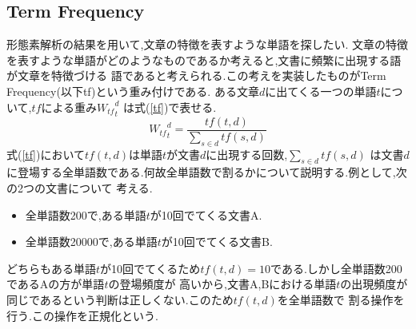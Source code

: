 \documentclass[a4j]{jarticle}
\begin{document}
\subsection{Term Frequency}
形態素解析の結果を用いて,文章の特徴を表すような単語を探したい.
文章の特徴を表すような単語がどのようなものであるか考えると,文書に頻繁に出現する語が文章を特徴づける
語であると考えられる.この考えを実装したものがTerm Frequency(以下tf)という重み付けである.
ある文章$d$に出てくる一つの単語$t$について,$tf$による重み${W_{tf}}_t^d$
は式(\ref{tf})で表せる.
\begin{equation}
  {W_{tf}}_t^d = \frac{tf(t,d)}{\sum_{s \in d}^{}tf(s,d)}
  \label{tf}
\end{equation}
式(\ref{tf})において$tf(t,d)$は単語$t$が文書$d$に出現する回数,$\sum_{s \in d}^{}tf(s,d)$
は文書$d$に登場する全単語数である.何故全単語数で割るかについて説明する.例として,次の2つの文書について
考える.
\begin{itemize}
  \item 全単語数200で,ある単語$t$が10回でてくる文書A.
  \item 全単語数20000で,ある単語$t$が10回でてくる文書B.
\end{itemize}
どちらもある単語$t$が10回でてくるため$tf(t,d)=10$である.しかし全単語数200であるAの方が単語$t$の登場頻度が
高いから,文書A,Bにおける単語$t$の出現頻度が同じであるという判断は正しくない.このため$tf(t,d)$を全単語数で
割る操作を行う.この操作を正規化という.
\end{document}
